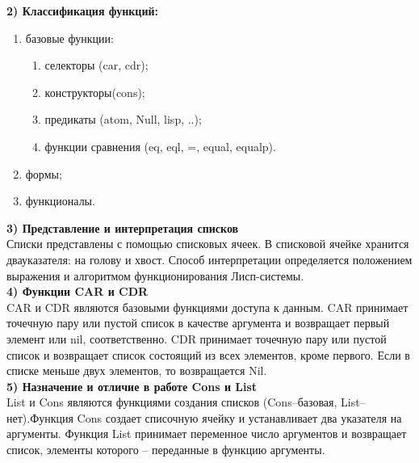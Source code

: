 \documentclass[a4paper, 12pt]{article}
\begin{document}
\hspace*{-13mm} \textbf{2) Классификация функций:}
\begin{enumerate}
	\item базовые функции:
		\begin{enumerate}
			\item селекторы (car, cdr);
			\item конструкторы(cons);
			\item предикаты (atom, Null, lisp, ..);
			\item функции сравнения (eq, eql, =, equal, equalp).
		\end{enumerate}
	\item формы;
	\item функционалы.
\end{enumerate}
\hspace*{-8mm} \textbf{3) Представление и интерпретация списков}
\\Списки представлены с помощью списковых ячеек. В списковой ячейке хранится двауказателя: на голову и хвост. Способ интерпретации определяется положением выражения и алгоритмом функционирования Лисп-системы. 
\\\hspace*{-8mm} \textbf{4) Функции CAR и CDR}
\\CAR и CDR являются базовыми функциями доступа к данным. CAR принимает точечную пару или пустой список в качестве аргумента и возвращает первый элемент или nil, соответственно. CDR принимает точечную  пару или пустой список и возвращает список состоящий из всех элементов, кроме первого. Если в списке меньше двух элементов, то возвращается Nil.
\\\hspace*{-8mm} \textbf{5) Назначение и отличие в работе Cons и List}
\\ List и Cons являются функциями создания списков (Cons–базовая, List–нет).Функция Cons создает списочную  ячейку  и  устанавливает два указателя на аргументы. Функция List принимает переменное число аргументов и возвращает список, элементы которого – переданные в функцию аргументы.
\end{document}
